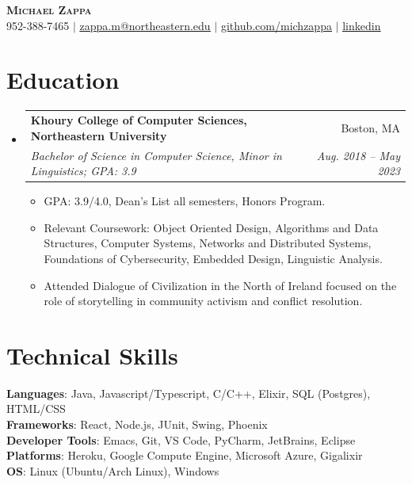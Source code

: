 \documentclass[letterpaper,11pt]{article}
\makeatletter
\newcommand{\resumeItem}[1]{
	\item\small{
		{#1 \vspace{-2pt}}
	}
}
\newcommand{\resumeSubheading}[4]{
	\vspace{-2pt}\item
	\begin{tabular*}{0.97\textwidth}[t]{l@{\extracolsep{\fill}}r}
		\textbf{#1} & #2 \\
		\textit{\small#3} & \textit{\small #4} \\
	\end{tabular*}\vspace{-7pt}
}
\newcommand{\resumeSubHeadingListStart}{\begin{itemize}[leftmargin=0.15in, label={}]}
\newcommand{\resumeSubHeadingListEnd}{\end{itemize}}
\newcommand{\resumeItemListStart}{\begin{itemize}}
\newcommand{\resumeItemListEnd}{\end{itemize}\vspace{-5pt}}
\makeatother
\begin{document}
\begin{center}
	\textbf{\Huge \scshape Michael Zappa} \\ \vspace{1pt}
	\small 952-388-7465 $|$ \href{mailto:zappa.m@northeastern.edu}{\underline{zappa.m@northeastern.edu}} $|$
	\href{https://github.com/michzappa}{\underline{github.com/michzappa}} $|$ \href{https://www.linkedin.com/in/michael-zappa-b01780152/}{\underline{linkedin}}
\end{center}

\section{Education}
\resumeSubHeadingListStart
\resumeSubheading
{Khoury College of Computer Sciences, Northeastern University}{Boston, MA}
{Bachelor of Science in Computer Science, Minor in Linguistics; GPA: 3.9}{Aug. 2018 -- May 2023}
\resumeItemListStart
\resumeItem{GPA: 3.9/4.0, Dean's List all semesters, Honors Program.}
\resumeItem{Relevant Coursework: Object Oriented Design, Algorithms and Data Structures, Computer Systems, Networks and Distributed Systems, Foundations of Cybersecurity, Embedded Design, Linguistic Analysis.}
\resumeItem{Attended Dialogue of Civilization in the North of Ireland focused on the role of storytelling in community activism and conflict resolution.}
\resumeItemListEnd
\resumeSubHeadingListEnd

\section{Technical Skills}
\begin{itemize}[leftmargin=0.15in, label={}]
	\small{\item{
	      \textbf{Languages}{: Java, Javascript/Typescript, C/C++, Elixir, SQL (Postgres), HTML/CSS} \\
	      \textbf{Frameworks}{: React, Node.js, JUnit, Swing, Phoenix} \\
	      \textbf{Developer Tools}{: Emacs, Git, VS Code, PyCharm, JetBrains, Eclipse}\\
	      \textbf{Platforms}{: Heroku, Google Compute Engine, Microsoft Azure, Gigalixir}\\
	      \textbf{OS}{: Linux (Ubuntu/Arch Linux), Windows}
	      }}
\end{itemize}
\end{document}
